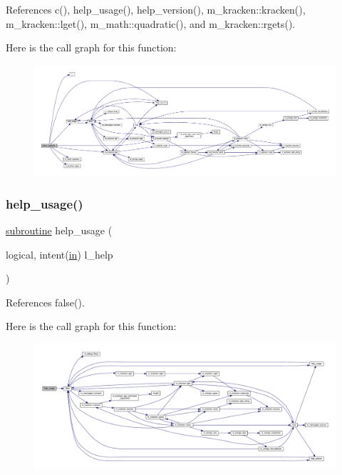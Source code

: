 References c(), help\+\_\+usage(), help\+\_\+version(), m\+\_\+kracken\+::kracken(), m\+\_\+kracken\+::lget(), m\+\_\+math\+::quadratic(), and m\+\_\+kracken\+::rgets().

Here is the call graph for this function\+:
\nopagebreak
\begin{figure}[H]
\begin{center}
\leavevmode
\includegraphics[width=350pt]{quadratic_8f90_a70f6d33f92261a5c0c975b0272b23140_cgraph}
\end{center}
\end{figure}
\mbox{\label{quadratic_8f90_a3e09a3b52ee8fb04eeb93fe5761626a8}} 
\subsubsection{\texorpdfstring{help\+\_\+usage()}{help\_usage()}}
{\footnotesize\ttfamily \hyperlink{M__stopwatch_83_8txt_acfbcff50169d691ff02d4a123ed70482}{subroutine} help\+\_\+usage (\begin{DoxyParamCaption}\item[{logical, intent(\hyperlink{M__journal_83_8txt_afce72651d1eed785a2132bee863b2f38}{in})}]{l\+\_\+help }\end{DoxyParamCaption})}



References false().

Here is the call graph for this function\+:
\nopagebreak
\begin{figure}[H]
\begin{center}
\leavevmode
\includegraphics[width=350pt]{quadratic_8f90_a3e09a3b52ee8fb04eeb93fe5761626a8_cgraph}
\end{center}
\end{figure}
\mbox{\label{quadratic_8f90_a39c21619b08a3c22f19e2306efd7f766}} 
